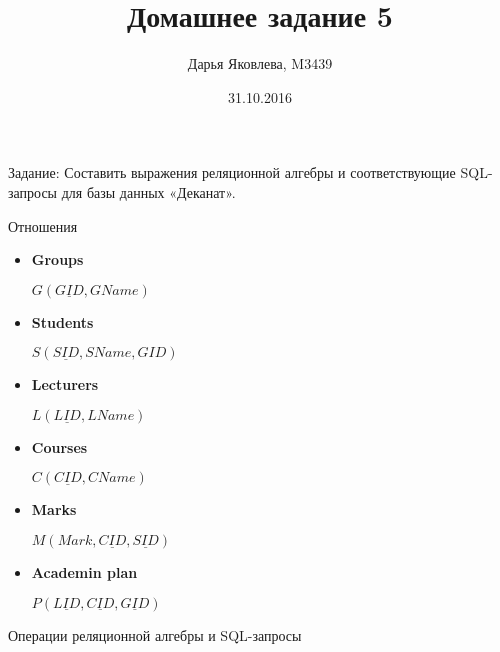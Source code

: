 \documentclass[12pt]{article}
\title{Домашнее задание 5}
\author{Дарья Яковлева, M3439}
\date{31.10.2016}
\begin{document}
\maketitle
\thispagestyle{empty}

Задание: Составить выражения реляционной алгебры и соответствующие SQL-запросы для базы данных «Деканат».



Отношения
\begin{itemize}

	\item \textbf{Groups}
	
		$G(\underline{GID}, GName)$
	\item \textbf{Students}
	
		$S(\underline{SID}, SName, GID)$
	
	\item \textbf{Lecturers}
	
		$L(\underline{LID}, LName)$

	\item \textbf{Courses}
	
		$C(\underline{CID}, CName)$
		
	\item \textbf{Marks}
	
		$M(Mark, \underline{CID}, \underline{SID})$
	
	\item \textbf{Academin plan}
	
		$P(\underline{LID}, \underline{CID}, \underline{GID})$
		
\end{itemize}

Операции реляционной алгебры и SQL-запросы
\end{document}
